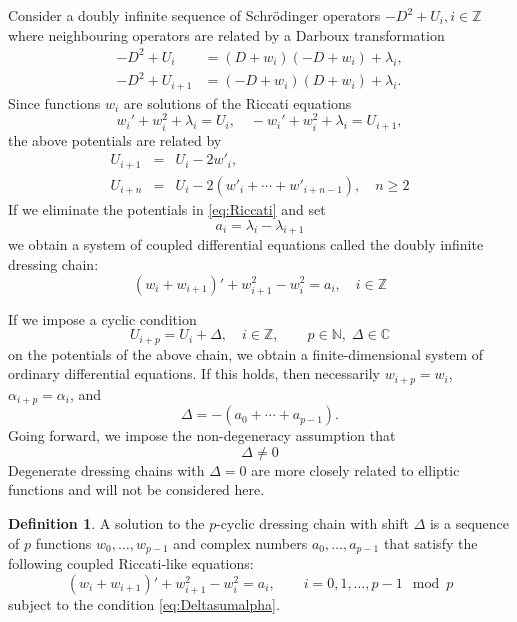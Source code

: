 \documentclass{amsart}
\theoremstyle{definition}
\newtheorem{definition}{Definition}
\newcommand{\N}{\mathbb{N}}
\newcommand{\Z}{\mathbb{Z}}
\newcommand{\C}{\mathbb{C}}
\begin{document}
Consider a doubly infinite sequence of Schr\"odinger operators
$-D^2 + U_i , i\in \Z$ where neighbouring operators are related by a
Darboux transformation
\begin{equation}
  \label{eq:Dxform}
  \begin{aligned}
    -D^2+U_i &= (D + w_i)(-D + w_i)+\lambda_i, \\
    -D^2+U_{i+1} &= (-D + w_i)(D + w_i)+\lambda_i.
  \end{aligned}
\end{equation}
Since functions $w_i$ are solutions of the Riccati equations
\begin{equation}\label{eq:Riccati}
 w_i' + w_i^2 +\lambda_i = U_i,\quad -w_i' +w_i^2+\lambda_i = U_{i+1},
 \end{equation}
 the above potentials are related by
\begin{eqnarray}
  U_{i+1} &=& U_i - 2 w'_i, \label{eq:Uplus1}\\
  U_{i+n} &=&U_i - 2 \left( w'_i+ \cdots + w'_{i+n-1}\right),\quad
  n\geq 2 \label{eq:Uplusn}
\end{eqnarray}
If we eliminate the potentials in \eqref{eq:Riccati} and set
\begin{equation}
  \label{eq:alphaidef}
  a_i =  \lambda_{i} - \lambda_{i+1}
\end{equation}
we obtain a system of coupled differential equations called the doubly
infinite dressing chain:
\begin{equation}
  \label{eq:drchain}
  (w_i + w_{i+1})' + w_{i+1}^2 - w_i^2 = a_i ,\quad i\in \Z
\end{equation}

If we impose a cyclic condition
\begin{equation}\label{eq:shift}
  U_{i+p} = U_i+\Delta,\quad i\in \Z,
  \qquad p\in \N,\; \Delta \in \C
 \end{equation}
 on the potentials of the above chain, we obtain a finite-dimensional
 system of ordinary differential equations.  If this holds, then
 necessarily $w_{i+p}=w_i$, $\alpha_{i+p}=\alpha_i$, and
\begin{equation}
  \label{eq:Deltasumalpha}
 \Delta= -(a_0 + \cdots + a_{p-1}). 
\end{equation}
Going forward, we
impose the non-degeneracy assumption that
\[ \Delta \neq 0 \] Degenerate dressing chains with $\Delta=0$ are
more closely related to elliptic functions \cite{veselov1993dressing} and
will not be considered here.

\begin{definition}
  A solution to the $p$-cyclic dressing chain with shift $\Delta$ is a
  sequence of $p$ functions $w_0,\ldots, w_{p-1}$ and complex numbers
  $a_0,\ldots, a_{p-1}$ that satisfy the following coupled
  Riccati-like equations:
\begin{equation}
  \label{eq:wachain}
  (w_i + w_{i+1})' + w_{i+1}^2 - w_i^2 = a_i ,\qquad
  i=0,1,\ldots, p-1 \mod p  
\end{equation}
subject to the condition \eqref{eq:Deltasumalpha}.  
\end{definition}
\end{document}
